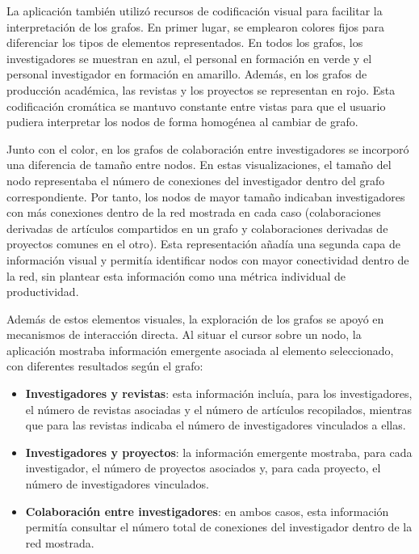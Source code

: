 \documentclass[11pt,spanish,listoffigures,listoftables]{tfgetsinf}
\begin{document}
La aplicación también utilizó recursos de codificación visual para facilitar la interpretación de los grafos. En primer lugar, se emplearon colores fijos para diferenciar los tipos de elementos representados. En todos los grafos, los investigadores se muestran en azul, el personal en formación en verde y el personal investigador en formación en amarillo. Además, en los grafos de producción académica, las revistas y los proyectos se representan en rojo. Esta codificación cromática se mantuvo constante entre vistas para que el usuario pudiera interpretar los nodos de forma homogénea al cambiar de grafo.



Junto con el color, en los grafos de colaboración entre investigadores se incorporó una diferencia de tamaño entre nodos. En estas visualizaciones, el tamaño del nodo representaba el número de conexiones del investigador dentro del grafo correspondiente. Por tanto, los nodos de mayor tamaño indicaban investigadores con más conexiones dentro de la red mostrada en cada caso (colaboraciones derivadas de artículos compartidos en un grafo y colaboraciones derivadas de proyectos comunes en el otro). Esta representación añadía una segunda capa de información visual y permitía identificar nodos con mayor conectividad dentro de la red, sin plantear esta información como una métrica individual de productividad.

Además de estos elementos visuales, la exploración de los grafos se apoyó en mecanismos de interacción directa. Al situar el cursor sobre un nodo, la aplicación mostraba información emergente asociada al elemento seleccionado, con diferentes resultados según el grafo: 
\begin{itemize}
    \item \textbf{Investigadores y revistas}: esta información incluía, para los investigadores, el número de revistas asociadas y el número de artículos recopilados, mientras que para las revistas indicaba el número de investigadores vinculados a ellas.

    \item \textbf{Investigadores y proyectos}: la información emergente mostraba, para cada investigador, el número de proyectos asociados y, para cada proyecto, el número de investigadores vinculados.

    \item \textbf{Colaboración entre investigadores}: en ambos casos, esta información permitía consultar el número total de conexiones del investigador dentro de la red mostrada.
\end{itemize}
\end{document}
